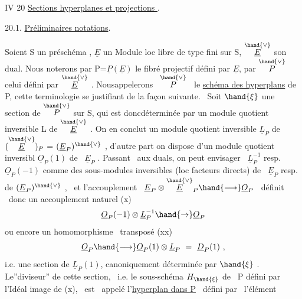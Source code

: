 IV 20 \quad \uline{Sections hyperplanes et projections }.

20.1. \quad \uline{Préliminaires  notations}.

Soient S un \quad préschéma , $\underline{E}$ un Module loc libre de type fini sur S,
$\overset{\hand{\vee}}{\underline{E}}$ son dual. Nous noterons par P=$\underline{P}(\underline{E})$ le fibré projectif défini par $\underline{E}$,
par $\overset{\hand{\vee}}{P}$ celui défini par $\overset{\hand{\vee}}{\underline{E}}$ . Nousappelerons \ $\overset{\hand{\vee}}{P}$ \ le \uline{schéma des hyperplans}
de P, cette terminologie se justifiant de la façon suivante. \ Soit
$\hand{\xi}$ une section de $\overset{\hand{\vee}}{P}$ sur S, qui est donc\hand{/}déterminée par un module quotient
inversible L de $\overset{\hand{\vee}}{\underline{E}}$ . On en conclut un module quotient inversible
$\underline{L}_P$ de$(\overset{\hand{\vee}}{\underline{E}})_P$ = $(\underline{E}_P)^{\hand{\vee}}$ , d'autre part on dispose d'un module quotient inversibl
$\underline{O}_P(1)$ de \ $\underline{E}_P$ . Passant \ aux duals, on peut envisager \ $\underline{L}_P^{-1}$ resp. $\underline{O}_P(-1)$
comme des sous-modules inversibles (loc facteurs directs) de \ $\underline{E}_P$ resp.
de $(\underline{E}_P)^{\hand{\vee}}$ , \ et l'accouplement \ $\underline{E}_P \otimes \overset{\hand{\vee}}{\underline{E}}_P \hand{\longrightarrow} \underline{O}_P$ \ définit \ donc un
accouplement naturel
(x) \[ \underline{O}_P(-1)\otimes\underline{L}_P^{-1} \hand{\to} \underline{O}_P \]
ou encore un homomorphisme \ transposé
(xx) \[ \underline{O}_P \hand{\longrightarrow} \underline{O}_P(1)\otimes\underline{L}_P \ = \ \underline{D}_P(1) \ , \]
i.e. une section de $\underline{L}_P(1)$, canoniquement déterminée par $\hand{\xi}$ . Le''diviseur''
de cette section, \ i.e. le sous-schéma $H_{\hand{\xi}}$ de \ P défini par l'Idéal
image de (x), \ est \ appelé l'\uline{hyperplan dans P} \ défini par \ l'élément
